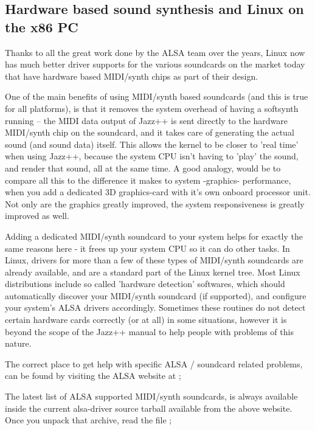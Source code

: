 \documentclass[letterpaper]{report}
\begin{document}
\subsection{Hardware based sound synthesis and Linux on the x86 PC}

Thanks to all the great work done by the ALSA team over the years, Linux
now has much better driver supports for the various soundcards on the market
today that have hardware based MIDI/synth chips as part of their design.

One of the main benefits of using MIDI/synth based soundcards (and
this is true for all platforms), is that it removes the system overhead
of having a softsynth running -- the MIDI data output of Jazz++ is sent
directly to the hardware MIDI/synth chip on the soundcard, and it takes
care of generating the actual sound (and sound data) itself. This allows
the kernel to be closer to 'real time' when using Jazz++, because the
system CPU isn't having to 'play' the sound, and render that sound, all
at the same time. A good analogy, would be to compare all this to the
difference it makes to system -graphics- performance, when you add
a dedicated 3D graphics-card with it's own onboard processor unit. Not
only are the graphics greatly improved, the system responsiveness is
greatly improved as well.

Adding a dedicated MIDI/synth soundcard to your system helps for
exactly the same reasons here - it frees up your system CPU so it
can do other tasks. In Linux, drivers for more than a few of these types of
MIDI/synth soundcards are already available, and are a standard part
of the Linux kernel tree. Most Linux distributions include so called
'hardware detection' softwares, which should automatically discover
your MIDI/synth soundcard (if supported), and configure your system's
ALSA drivers accordingly. Sometimes these routines do not detect certain
hardware cards correctly (or at all) in some situations, however it is
beyond the scope of the Jazz++ manual to help people with problems of this
nature.

The correct place to get help with specific ALSA / soundcard related
problems, can be found by visiting the ALSA website at ;


The latest list of ALSA supported MIDI/synth soundcards, is always
available inside the current alsa-driver source tarball available from
the above website. Once you unpack that archive, read the file ;
\end{document}

